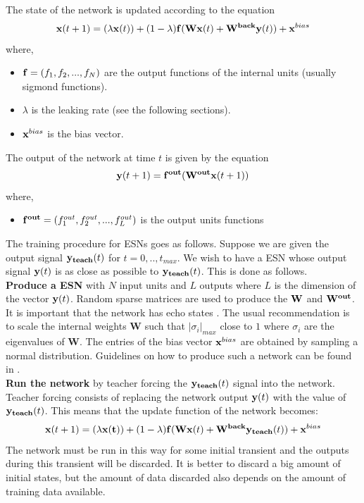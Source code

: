 \documentclass[letterpaper,9pt]{article}
\begin{document}
The state of the network is updated according to the equation
\begin{equation}
{\bf x}(t+1)= (\lambda {\bf x}(t)) + (1-\lambda){\bf f}({\bf Wx}(t) + {\bf W^{back}y}(t)) + {\bf x}^{bias}
\end{equation}
where,
\begin{itemize}
  \item ${\bf f}=(f_1,f_2,...,f_N)$ are the output functions of the internal units (usually sigmond functions).
  \item $\lambda$ is the leaking rate (see the following sections).
  \item ${\bf x}^{bias}$ is the bias vector.
\end{itemize}
The output of the network at time $t$ is given by the equation
\begin{equation}
{\bf y}(t+1)={\bf f^{out}}({\bf W^{out}}{\bf x}(t+1))
\end{equation}
where,
\begin{itemize}
  \item ${\bf f^{out}}=(f_1^{out},f_2^{out},...,f_L^{out})$ is the output units functions
\end{itemize}
The training procedure for ESNs goes as follows. Suppose we are given the output signal ${\bf y_{teach}}(t)$ for $t=0,..,t_{max}$. We wish to have a ESN whose output signal ${\bf y}(t)$ is as close as possible to ${\bf y_{teach}}(t)$. This is done as follows.\\

{\bf Produce a ESN} with $N$ input units and $L$ outputs where $L$ is the dimension of the vector ${\bf y}(t)$. Random sparse matrices are used to produce the ${\bf W}$ and ${\bf W^{out}}$. It is important that the network has echo states \cite{JaegerESNTutorial}. The usual recommendation is to scale the internal weights {\bf W} such that $|\sigma_i |_{max}$ close to $1$ where $\sigma_i$ are the eigenvalues of {\bf W}. The entries of the bias vector ${\bf x}^{bias}$ are obtained by sampling a normal distribution. Guidelines on how to produce such a network can be found in \cite{JaegerESNTutorial}.\\

{\bf Run the network} by teacher forcing the ${\bf y_{teach}}(t)$ signal into the network. Teacher forcing consists of replacing the network output ${\bf y}(t)$ with the value of ${\bf y_{teach}}(t)$. This means that the update function of the network becomes:
\begin{equation}
{\bf x}(t+1)= (\lambda {\bf x(t)}) + (1-\lambda){\bf f}({\bf Wx}(t) + {\bf W^{back}y_{teach}}(t)) + {\bf x}^{bias}
\end{equation}
The network must be run in this way for some initial transient and the outputs during this transient will be discarded. It is better to discard a big amount of initial states, but the amount of data discarded also depends on the amount of training data available. \pagebreak
\end{document}

